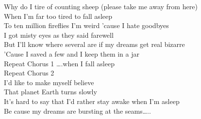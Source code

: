 Why do I  tire of counting  sheep (please take me away from  here)\\
When I'm far too  tired to fall asleep\\
 To ten million  fireflies  I'm weird 'cause I hate goodbyes\\
 I got misty  eyes as they said farewell\\
 But I'll know where  several are  if my dreams get real bizarre\\
'Cause I  saved a few and I  keep them in a  jar\\
Repeat Chorus 1 ….when I fall asleep\\
Repeat Chorus 2\\
 I'd like to  make myself believe\\
That planet  Earth  turns  slowly\\
It's  hard to say that I'd  rather stay awake when  I'm asleep\\
Be cause my dreams are  bursting at the  seams….. 

